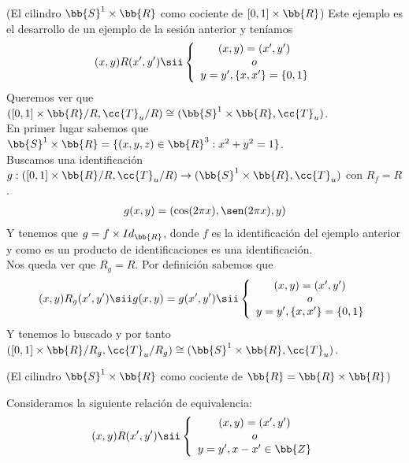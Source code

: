  \begin{ejemplo}(El cilindro $\bb{S}^1\times \bb{R}$ como cociente de $[0,1]\times \bb{R}$)
    Este ejemplo es el desarrollo de un ejemplo de la sesión anterior y teníamos
    \begin{align*}
        (x,y)R(x',y') \sii \left\{
        \begin{array}{c}
            (x,y)=(x',y')\\
            o\\
            y=y', \{x,x'\}=\{0,1\}
        \end{array}
        \right.
    \end{align*}
    Queremos ver que $([0,1]\times \bb{R}/R, \cc{T}_u/R) \cong (\bb{S}^1\times \bb{R}, \cc{T}_u)$.\\

    En primer lugar sabemos que $\bb{S}^1\times \bb{R}=\{(x,y,z)\in \bb{R}^3: x^2 + y^2 = 1\}$.\\

    Buscamos una identificación $g:([0,1]\times \bb{R}/R, \cc{T}_u/R) \to (\bb{S}^1\times \bb{R}, \cc{T}_u)$ con $R_f=R$.
    \begin{align*}
        g(x,y)=(\cos(2\pi x ), \sen(2\pi x),y)
    \end{align*}
    Y tenemos que $g=f\times Id_{\bb{R}}$, donde $f$ es la identificación del ejemplo anterior y como es un producto de identificaciones es una identificación.\\

    Nos queda ver que $R_g=R$. Por definición sabemos que 
    \begin{align*}
        (x,y)R_g(x',y') \sii g(x,y)=g(x',y') \sii \left\{
            \begin{array}{c}
                (x,y)=(x',y')\\
                o\\
                y=y', \{x,x'\}=\{0,1\}
            \end{array}
        \right.
    \end{align*}
    Y tenemos lo buscado y por tanto $([0,1]\times \bb{R}/R_g, \cc{T}_u/R_g) \cong (\bb{S}^1\times \bb{R}, \cc{T}_u)$.
    \endsquare
 \end{ejemplo}

 \begin{ejemplo}
    (El cilindro $\bb{S}^1\times \bb{R}$ como cociente de $\bb{R}=\bb{R}\times \bb{R}$)

    Consideramos la siguiente relación de equivalencia:
    \begin{align*}
        (x,y)R(x',y') \sii\left\{
            \begin{array}{c}
                (x,y)=(x',y')\\
                o\\
                y=y', x-x'\in \bb{Z}
            \end{array}
        \right.
    \end{align*}
 \end{ejemplo}